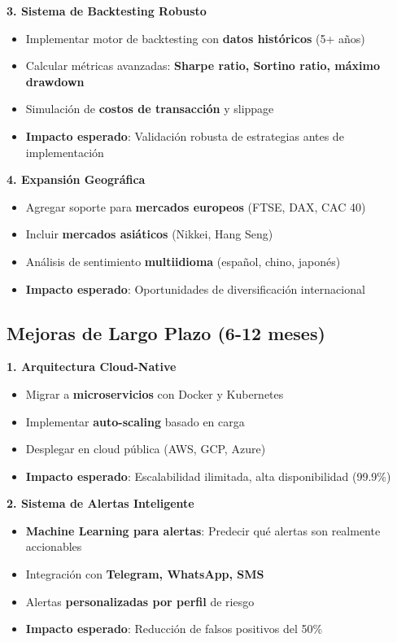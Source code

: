 \documentclass[12pt,a4paper]{report}
\begin{document}
\textbf{3. Sistema de Backtesting Robusto}
\begin{itemize}
    \item Implementar motor de backtesting con \textbf{datos históricos} (5+ años)
    \item Calcular métricas avanzadas: \textbf{Sharpe ratio, Sortino ratio, máximo drawdown}
    \item Simulación de \textbf{costos de transacción} y slippage
    \item \textbf{Impacto esperado}: Validación robusta de estrategias antes de implementación
\end{itemize}

\textbf{4. Expansión Geográfica}
\begin{itemize}
    \item Agregar soporte para \textbf{mercados europeos} (FTSE, DAX, CAC 40)
    \item Incluir \textbf{mercados asiáticos} (Nikkei, Hang Seng)
    \item Análisis de sentimiento \textbf{multiidioma} (español, chino, japonés)
    \item \textbf{Impacto esperado}: Oportunidades de diversificación internacional
\end{itemize}

\subsection{Mejoras de Largo Plazo (6-12 meses)}

\textbf{1. Arquitectura Cloud-Native}
\begin{itemize}
    \item Migrar a \textbf{microservicios} con Docker y Kubernetes
    \item Implementar \textbf{auto-scaling} basado en carga
    \item Desplegar en cloud pública (AWS, GCP, Azure)
    \item \textbf{Impacto esperado}: Escalabilidad ilimitada, alta disponibilidad (99.9\%)
\end{itemize}

\textbf{2. Sistema de Alertas Inteligente}
\begin{itemize}
    \item \textbf{Machine Learning para alertas}: Predecir qué alertas son realmente accionables
    \item Integración con \textbf{Telegram, WhatsApp, SMS}
    \item Alertas \textbf{personalizadas por perfil} de riesgo
    \item \textbf{Impacto esperado}: Reducción de falsos positivos del 50\%
\end{itemize}
\end{document}
